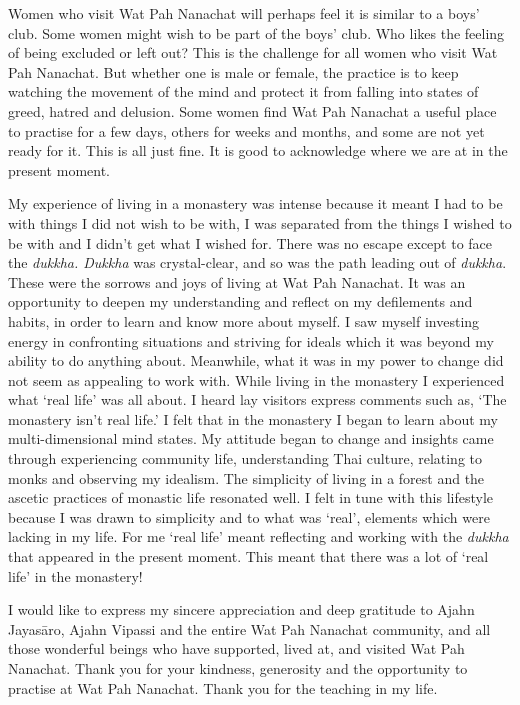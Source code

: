 Women who visit Wat Pah Nanachat will perhaps feel it is similar to a
boys' club. Some women might wish to be part of the boys' club. Who
likes the feeling of being excluded or left out? This is the challenge
for all women who visit Wat Pah Nanachat. But whether one is male or
female, the practice is to keep watching the movement of the mind and
protect it from falling into states of greed, hatred and delusion. Some
women find Wat Pah Nanachat a useful place to practise for a few days,
others for weeks and months, and some are not yet ready for it. This is
all just fine. It is good to acknowledge where we are at in the present
moment.

My experience of living in a monastery was intense because it meant I
had to be with things I did not wish to be with, I was separated from
the things I wished to be with and I didn't get what I wished for. There
was no escape except to face the \emph{dukkha. Dukkha} was
crystal-clear, and so was the path leading out of \emph{dukkha}. These
were the sorrows and joys of living at Wat Pah Nanachat. It was an
opportunity to deepen my understanding and reflect on my defilements and
habits, in order to learn and know more about myself. I saw myself
investing energy in confronting situations and striving for ideals which
it was beyond my ability to do anything about. Meanwhile, what it was in
my power to change did not seem as appealing to work with. While living
in the monastery I experienced what `real life' was all about. I heard
lay visitors express comments such as, `The monastery isn't real life.'
I felt that in the monastery I began to learn about my multi-dimensional
mind states. My attitude began to change and insights came through
experiencing community life, understanding Thai culture, relating to
monks and observing my idealism. The simplicity of living in a forest
and the ascetic practices of monastic life resonated well. I felt in
tune with this lifestyle because I was drawn to simplicity and to what
was `real', elements which were lacking in my life. For me `real life'
meant reflecting and working with the \emph{dukkha} that appeared in the
present moment. This meant that there was a lot of `real life' in the
monastery!

I would like to express my sincere appreciation and deep gratitude to
Ajahn Jayasāro, Ajahn Vipassi and the entire Wat Pah Nanachat community,
and all those wonderful beings who have supported, lived at, and visited
Wat Pah Nanachat. Thank you for your kindness, generosity and the
opportunity to practise at Wat Pah Nanachat. Thank you for the teaching
in my life.

